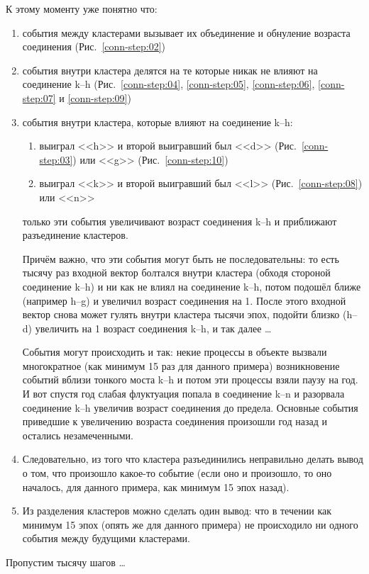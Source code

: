 \documentclass[unicode, 12pt, a4paper,oneside,fleqn]{article}
\begin{document}
\clearpage
К этому моменту уже понятно что:
\begin{enumerate}
\item события между кластерами вызывает их объединение и обнуление
  возраста соединения (Рис.~\ref{conn-step:02})
\item события внутри кластера делятся на те которые никак не влияют
  на соединение k--h (Рис.~\ref{conn-step:04}, \ref{conn-step:05},
  \ref{conn-step:06}, \ref{conn-step:07} и \ref{conn-step:09})
\item события внутри кластера, которые влияют на соединение k--h:
  \begin{enumerate}
  \item выиграл <<h>> и второй выигравший был <<d>>
    (Рис.~\ref{conn-step:03}) или <<g>> (Рис.~\ref{conn-step:10})
  \item выиграл <<k>> и второй выигравший был <<l>>
    (Рис.~\ref{conn-step:08}) или <<n>>
  \end{enumerate}
  только эти события увеличивают возраст соединения k--h и
  приближают разъединение кластеров.
  
  Причём важно, что эти события могут быть не последовательны: то есть
  тысячу раз входной вектор болтался внутри кластера (обходя стороной
  соединение k--h) и ни как не влиял на соединение k--h, потом подошёл
  ближе (например h--g) и увеличил возраст соединения на 1. После
  этого входной вектор снова может гулять внутри кластера тысячи эпох,
  подойти близко (h--d) увеличить на 1 возраст соединения k--h, и так
  далее \ldots

  События могут происходить и так: некие процессы в объекте вызвали
  многократное (как минимум 15 раз для данного примера) возникновение
  событий вблизи тонкого моста k--h и потом эти процессы взяли паузу
  на год. И вот спустя год слабая флуктуация попала в соединение k--n
  и разорвала соединение k--h увеличив возраст соединения до
  предела. Основные события приведшие к увеличению возраста соединения
  произошли год назад и остались незамеченными.

\item Следовательно, из того что кластера разъединились неправильно
  делать вывод о том, что произошло какое-то событие (если оно и
  произошло, то оно началось, для данного примера, как минимум 15 эпох
  назад).
\item Из разделения кластеров можно сделать один вывод: что в течении
  как минимум 15 эпох (опять же для данного примера) не происходило ни
  одного события между будущими кластерами.
\end{enumerate}
Пропустим тысячу шагов \ldots
\end{document}
